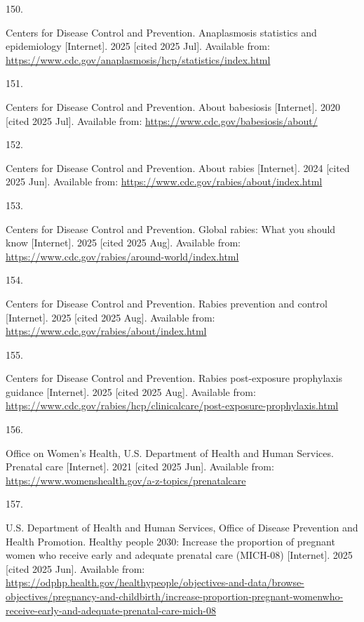 \documentclass[
  english,
  letterpaper,
]{report}
\newlength{\cslhangindent}
\newlength{\csllabelwidth}
\newenvironment{CSLReferences}[2] %
 {\begin{list}{}{%
  \setlength{\itemindent}{0pt}
  \setlength{\leftmargin}{0pt}
  \setlength{\parsep}{0pt}
  \ifodd #1
   \setlength{\leftmargin}{\cslhangindent}
   \setlength{\itemindent}{-1\cslhangindent}
  \fi
  \setlength{\itemsep}{#2\baselineskip}}}
 {\end{list}}
\newcommand{\CSLLeftMargin}[1]{\parbox[t]{\csllabelwidth}{\strut#1\strut}}
\newcommand{\CSLRightInline}[1]{\parbox[t]{\linewidth - \csllabelwidth}{\strut#1\strut}}
\begin{document}
\begin{CSLReferences}{0}{1}
\CSLLeftMargin{150. }%
\CSLRightInline{Centers for Disease Control and Prevention. Anaplasmosis
statistics and epidemiology {[}Internet{]}. 2025 {[}cited 2025 Jul{]}.
Available from:
\url{https://www.cdc.gov/anaplasmosis/hcp/statistics/index.html}}

\CSLLeftMargin{151. }%
\CSLRightInline{Centers for Disease Control and Prevention. About
babesiosis {[}Internet{]}. 2020 {[}cited 2025 Jul{]}. Available from:
\url{https://www.cdc.gov/babesiosis/about/}}

\CSLLeftMargin{152. }%
\CSLRightInline{Centers for Disease Control and Prevention. About rabies
{[}Internet{]}. 2024 {[}cited 2025 Jun{]}. Available from:
\url{https://www.cdc.gov/rabies/about/index.html}}

\CSLLeftMargin{153. }%
\CSLRightInline{Centers for Disease Control and Prevention. Global
rabies: What you should know {[}Internet{]}. 2025 {[}cited 2025 Aug{]}.
Available from:
\url{https://www.cdc.gov/rabies/around-world/index.html}}

\CSLLeftMargin{154. }%
\CSLRightInline{Centers for Disease Control and Prevention. Rabies
prevention and control {[}Internet{]}. 2025 {[}cited 2025 Aug{]}.
Available from: \url{https://www.cdc.gov/rabies/about/index.html}}

\CSLLeftMargin{155. }%
\CSLRightInline{Centers for Disease Control and Prevention. Rabies
post-exposure prophylaxis guidance {[}Internet{]}. 2025 {[}cited 2025
Aug{]}. Available from:
\url{https://www.cdc.gov/rabies/hcp/clinicalcare/post-exposure-prophylaxis.html}}

\CSLLeftMargin{156. }%
\CSLRightInline{Office on Women's Health, U.S. Department of Health and
Human Services. Prenatal care {[}Internet{]}. 2021 {[}cited 2025 Jun{]}.
Available from:
\url{https://www.womenshealth.gov/a-z-topics/prenatalcare}}

\CSLLeftMargin{157. }%
\CSLRightInline{U.S. Department of Health and Human Services, Office of
Disease Prevention and Health Promotion. Healthy people 2030: Increase
the proportion of pregnant women who receive early and adequate prenatal
care (MICH-08) {[}Internet{]}. 2025 {[}cited 2025 Jun{]}. Available
from:
\url{https://odphp.health.gov/healthypeople/objectives-and-data/browse-objectives/pregnancy-and-childbirth/increase-proportion-pregnant-womenwho-receive-early-and-adequate-prenatal-care-mich-08}}


\end{CSLReferences}
\end{document}
